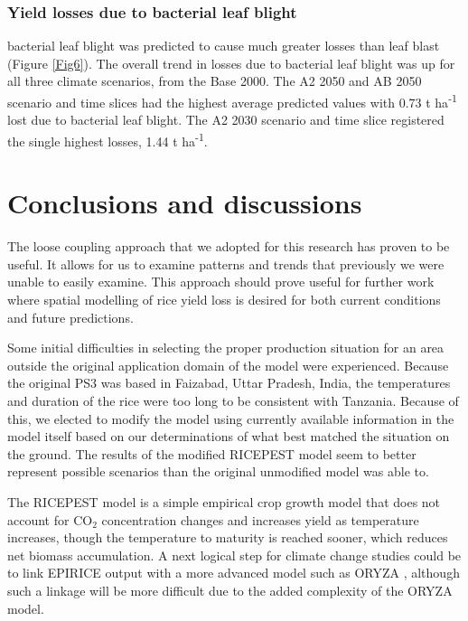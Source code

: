     \subsubsection{Yield losses due to bacterial leaf blight}
    \label{bb_yield_losses}
    bacterial leaf blight was predicted to cause much greater losses than leaf blast (Figure \ref{Fig6}). The overall trend in losses due to bacterial leaf blight was up for all three climate scenarios, from the Base 2000. The A2 2050 and AB 2050 scenario and time slices had the highest average predicted values with 0.73 t ha\textsuperscript{-1} lost due to bacterial leaf blight. The A2 2030 scenario and time slice registered the single highest losses, 1.44 t ha\textsuperscript{-1}.
        
    \section{Conclusions and discussions}
    \label{conclusions}
    The loose coupling approach that we adopted for this research has proven to be useful. It allows for us to examine patterns and trends that previously we were unable to easily examine. This approach should prove useful for further work where spatial modelling of rice yield loss is desired for both current conditions and future predictions.
    
    Some initial difficulties in selecting the proper production situation for an area outside the original application domain of the model were experienced. Because the original PS3 was based in Faizabad, Uttar Pradesh, India, the temperatures and duration of the rice were too long to be consistent with Tanzania. Because of this, we elected to modify the model using currently available information in the model itself based on our determinations of what best matched the situation on the ground. The results of the modified RICEPEST model seem to better represent possible scenarios than the original unmodified model was able to.
    
    The RICEPEST model is a simple empirical crop growth model that does not account for CO$_2$ concentration changes and increases yield as temperature increases, though the temperature to maturity is reached sooner, which reduces net biomass accumulation. A next logical step for climate change studies could be to link EPIRICE output with a more advanced model such as ORYZA \citep{Oryza}, although such a linkage will be more difficult due to the added complexity of the ORYZA model.
    
